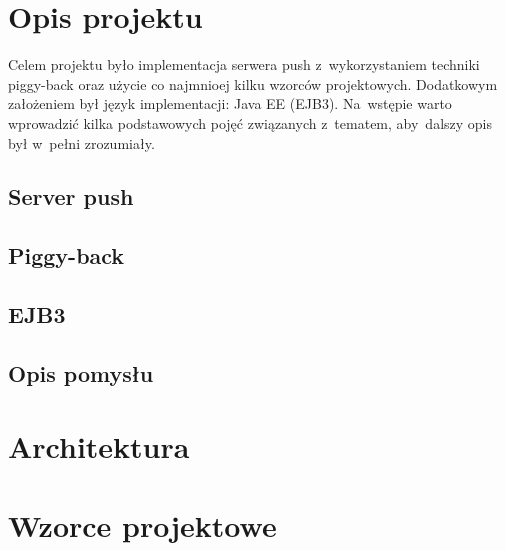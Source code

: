 \documentclass[11pt]{aghdpl}
\author{Wojciech Kasperek, Agnieszka Maksylewicz,}
\date{2014/2015}
\begin{document}
\titlepages
\vspace*{-20mm}
\tableofcontents
\clearpage

\chapter{Opis projektu}
Celem projektu było implementacja serwera push z~wykorzystaniem techniki piggy-back oraz użycie co najmnioej kilku wzorców projektowych. Dodatkowym założeniem był język implementacji: Java EE (EJB3). Na~wstępie warto wprowadzić kilka podstawowych pojęć związanych z~tematem, aby~dalszy opis był w~pełni zrozumiały.

\section{Server push}

\section{Piggy-back}

\section{EJB3}

\section{Opis pomysłu}


\chapter{Architektura}

\chapter{Wzorce projektowe}
\end{document}
